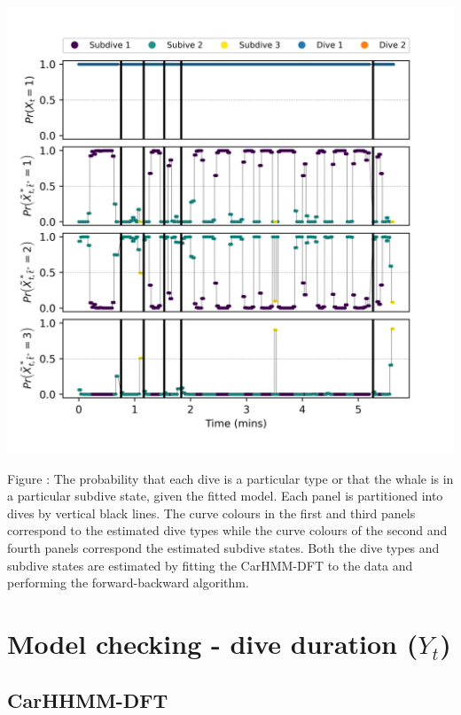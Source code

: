 \documentclass{article}
\begin{document}
        \begin{center}
        \includegraphics[width=6in]{../Plots/2019/20190902-182840-CATs_OB_1_0_267_CarHMM_decoded_states.png}
        \end{center}
        
        \noindent Figure : The probability that each dive is a particular type or that the whale is in a particular subdive state, given the fitted model. Each panel is partitioned into dives by vertical black lines. The curve colours in the first and third panels correspond to the estimated dive types while the curve colours of the second and fourth panels correspond the estimated subdive states. Both the dive types and subdive states are estimated by fitting the CarHMM-DFT to the data and performing the forward-backward algorithm.
        \addtocounter{fignum}{1}
        
    \newpage
    \section{Model checking - dive duration ($Y_t$)}
    
        \subsection{CarHHMM-DFT}
        
\end{document}
